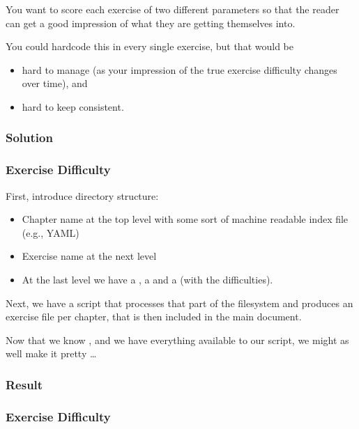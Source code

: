 {\begin{frame}[fragile]
  \vspace{5mm}
  You want to score each exercise of two different parameters so that the reader can get a good impression of what they are getting themselves into.
  
  \vspace{5mm}
  You could hardcode this in every single exercise, but that would be
  \begin{itemize}
    \item hard to manage (as your impression of the true exercise difficulty changes over time), and
    \item hard to keep consistent.
  \end{itemize}
\end{frame}

\subsubsection{Solution}
\begin{frame}[fragile]
  \frametitle{Exercise Difficulty }
  \vspace{3mm}
  First, introduce directory structure:
  \begin{itemize}
    \item Chapter name at the top level with some sort of machine readable index file (e.g., YAML)
    \item Exercise name at the next level
    \item At the last level we have a , a  and a  (with the difficulties).
  \end{itemize}
  
  \vspace{5mm}
  Next, we have a script that processes that part of the filesystem and produces an exercise file per chapter, that is then included in the main document.
  
  \vspace{5mm}
  Now that we know \TikZ, and we have everything available to our script, we might as well make it pretty \ldots
\end{frame}

\subsubsection{Result}
\begin{frame}[fragile]
  \frametitle{Exercise Difficulty }
  \vspace{3mm}
  

\end{frame}}
